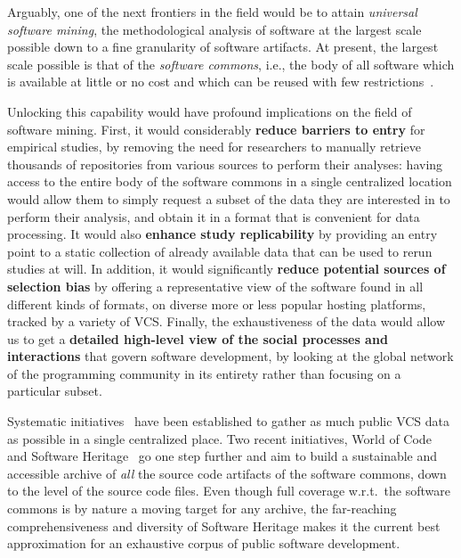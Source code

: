 Arguably, one of the next frontiers in the field would be to attain
\emph{universal software mining}, the methodological analysis of software at
the largest scale possible down to a fine granularity of software artifacts.
At present, the largest scale possible is that of the \emph{software commons},
i.e., the body of all software which is available at little or no cost and
which can be reused with few
restrictions~\cite{1999-beagle-in-commons,kranich2008information}.

Unlocking this capability would have profound implications on the field of
software mining. First, it would considerably \textbf{reduce barriers to entry}
for empirical studies, by removing the need for researchers to manually
retrieve thousands of repositories from various sources to perform their
analyses: having access to the entire body of the software commons in a single
centralized location would allow them to simply request a subset of the data
they are interested in to perform their analysis, and obtain it in a format
that is convenient for data processing. It would also \textbf{enhance study
replicability} by providing an entry point to a static collection of already
available data that can be used to rerun studies at will.
In addition, it would significantly \textbf{reduce potential sources of
selection bias} by offering a representative view of the software found in
all different kinds of formats, on diverse more or less popular hosting
platforms, tracked by a variety of \gls{VCS}.  Finally, the exhaustiveness of
the data would allow us to get a \textbf{detailed high-level view of the social
processes and interactions} that govern software development, by looking at the
global network of the programming community in its entirety rather than
focusing on a particular subset.

Systematic initiatives~\cite{flossmole2006,gao2007archive,mockus2009}
have been established to gather as much public \gls{VCS} data as possible in a
single centralized place. Two recent initiatives, World of
Code~\cite{mockus2019woc} and Software Heritage~\cite{swhipres2017,
swhcacm2018} go one step further and aim to build a sustainable and accessible
archive of \emph{all} the source code artifacts of the software commons, down
to the level of the source code files. Even though full coverage w.r.t.\ the
software commons is by nature a moving target for any archive, the far-reaching
comprehensiveness and diversity of Software Heritage makes it the current best
approximation for an exhaustive corpus of public software development.

